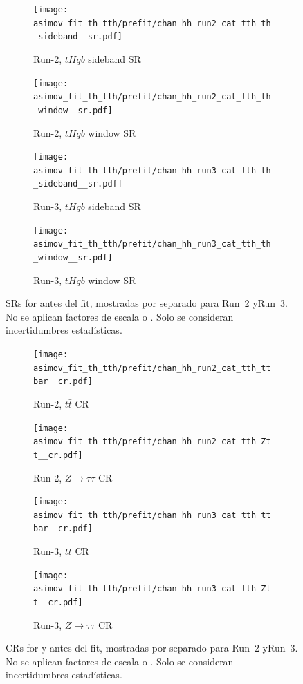 \begin{figure}[htbp]
  \centering
  \begin{subfigure}[t]{0.45\textwidth}
    \centering
    \texttt{[image: asimov\_fit\_th\_tth/prefit/chan\_hh\_run2\_cat\_tth\_th\_sideband\_\_sr.pdf]}
    \caption{Run-2, $tHqb$ sideband SR}
  \end{subfigure}
  \hfill
  \begin{subfigure}[t]{0.45\textwidth}
    \centering
    \texttt{[image: asimov\_fit\_th\_tth/prefit/chan\_hh\_run2\_cat\_tth\_th\_window\_\_sr.pdf]}
    \caption{Run-2, $tHqb$ window SR}
  \end{subfigure}

  \vspace{0.4cm}
  \begin{subfigure}[t]{0.45\textwidth}
    \centering
    \texttt{[image: asimov\_fit\_th\_tth/prefit/chan\_hh\_run3\_cat\_tth\_th\_sideband\_\_sr.pdf]}
    \caption{Run-3, $tHqb$ sideband SR}
  \end{subfigure}
  \hfill
  \begin{subfigure}[t]{0.45\textwidth}
    \centering
    \texttt{[image: asimov\_fit\_th\_tth/prefit/chan\_hh\_run3\_cat\_tth\_th\_window\_\_sr.pdf]}
    \caption{Run-3, $tHqb$ window SR}
  \end{subfigure}

  \caption{SRs for \thqb antes del fit, mostradas por separado para Run~2 yRun~3. No se aplican factores de escala \ztautau o \ttbar. Solo se consideran incertidumbres estadísticas.}
  \label{res:fit_inputs_2}
\end{figure}

\begin{figure}[htbp]
  \centering
  \begin{subfigure}[t]{0.45\textwidth}
    \centering
    \texttt{[image: asimov\_fit\_th\_tth/prefit/chan\_hh\_run2\_cat\_tth\_ttbar\_\_cr.pdf]}
    \caption{Run-2, $t\bar{t}$ CR}
  \end{subfigure}
  \hfill
  \begin{subfigure}[t]{0.45\textwidth}
    \centering
    \texttt{[image: asimov\_fit\_th\_tth/prefit/chan\_hh\_run2\_cat\_tth\_Ztt\_\_cr.pdf]}
    \caption{Run-2, $Z\to\tau\tau$ CR}
  \end{subfigure}

  \vspace{0.4cm}
  \begin{subfigure}[t]{0.45\textwidth}
    \centering
    \texttt{[image: asimov\_fit\_th\_tth/prefit/chan\_hh\_run3\_cat\_tth\_ttbar\_\_cr.pdf]}
    \caption{Run-3, $t\bar{t}$ CR}
  \end{subfigure}
  \hfill
  \begin{subfigure}[t]{0.45\textwidth}
    \centering
    \texttt{[image: asimov\_fit\_th\_tth/prefit/chan\_hh\_run3\_cat\_tth\_Ztt\_\_cr.pdf]}
    \caption{Run-3, $Z\to\tau\tau$ CR}
  \end{subfigure}

  \caption{CRs for \ttbar y \ztautau antes del fit, mostradas por separado para Run~2 yRun~3. No se aplican factores de escala \ztautau o \ttbar. Solo se consideran incertidumbres estadísticas.}
  \label{res:fit_inputs_3}
\end{figure}

